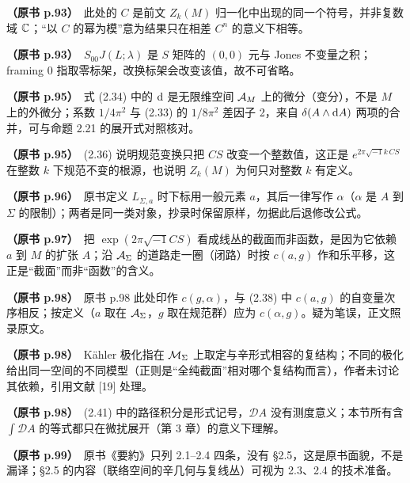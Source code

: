 \noindent \textbf{（原书 p.93）}\ 此处的 $C$ 是前文 $Z_k(M)$ 归一化中出现的同一个符号，并非复数域 $\mathbb{C}$；“以 $C$ 的幂为模”意为结果只在相差 $C^{n}$ 的意义下相等。\par\smallskip

\noindent \textbf{（原书 p.93）}\ $S_{00}J(L;\lambda)$ 是 $S$ 矩阵的 $(0,0)$ 元与 Jones 不变量之积；framing $0$ 指取零标架，改换标架会改变该值，故不可省略。\par\smallskip

\noindent \textbf{（原书 p.95）}\ 式 (2.34) 中的 $\mathrm{d}$ 是无限维空间 $\mathcal{A}_M$ 上的微分（变分），不是 $M$ 上的外微分；系数 $1/4\pi^{2}$ 与 (2.33) 的 $1/8\pi^{2}$ 差因子 2，来自 $\delta(A\wedge\mathrm{d} A)$ 两项的合并，可与命题 2.21 的展开式对照核对。\par\smallskip

\noindent \textbf{（原书 p.95）}\ (2.36) 说明规范变换只把 $CS$ 改变一个整数值，这正是 $e^{2\pi\sqrt{-1}k\,CS}$ 在整数 $k$ 下规范不变的根源，也说明 $Z_k(M)$ 为何只对整数 $k$ 有定义。\par\smallskip

\noindent \textbf{（原书 p.96）}\ 原书定义 $L_{\Sigma,a}$ 时下标用一般元素 $a$，其后一律写作 $\alpha$（$\alpha$ 是 $A$ 到 $\Sigma$ 的限制）；两者是同一类对象，抄录时保留原样，勿据此后退修改公式。\par\smallskip

\noindent \textbf{（原书 p.97）}\ 把 $\exp(2\pi\sqrt{-1}CS)$ 看成线丛的截面而非函数，是因为它依赖 $a$ 到 $M$ 的扩张 $A$；沿 $\mathcal{A}_\Sigma$ 的道路走一圈（闭路）时按 $c(a,g)$ 作和乐平移，这正是“截面”而非“函数”的含义。\par\smallskip

\noindent \textbf{（原书 p.98）}\ 原书 p.98 此处印作 $c(g,\alpha)$，与 (2.38) 中 $c(a,g)$ 的自变量次序相反；按定义（$a$ 取在 $\mathcal{A}_\Sigma$，$g$ 取在规范群）应为 $c(\alpha,g)$。疑为笔误，正文照录原文。\par\smallskip

\noindent \textbf{（原书 p.98）}\ Kähler 极化指在 $\mathcal{M}_\Sigma$ 上取定与辛形式相容的复结构；不同的极化给出同一空间的不同模型（正则是“全纯截面”相对哪个复结构而言），作者未讨论其依赖，引用文献 [19] 处理。\par\smallskip

\noindent \textbf{（原书 p.98）}\ (2.41) 中的路径积分是形式记号，$\mathcal{D}A$ 没有测度意义；本节所有含 $\int\mathcal{D}A$ 的等式都只在微扰展开（第 3 章）的意义下理解。\par\smallskip

\noindent \textbf{（原书 p.99）}\ 原书《要約》只列 2.1--2.4 四条，没有 §2.5，这是原书面貌，不是漏译；§2.5 的内容（联络空间的辛几何与复线丛）可视为 2.3、2.4 的技术准备。\par\smallskip

